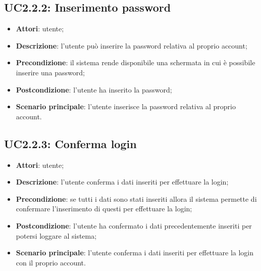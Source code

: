 \subsection{UC2.2.2: Inserimento password}
\label{UC2.2.2}
\begin{itemize}
\item \textbf{Attori}: utente;
\item \textbf{Descrizione}: l'utente può inserire la password relativa al proprio account;
\item \textbf{Precondizione}: il sistema rende disponibile una schermata in cui è possibile inserire una password;
\item \textbf{Postcondizione}: l'utente ha inserito la password;
\item \textbf{Scenario principale}:
l'utente inserisce la password relativa al proprio account.
\end{itemize}
\subsection{UC2.2.3: Conferma login}
\label{UC2.2.3}
\begin{itemize}
\item \textbf{Attori}: utente;
\item \textbf{Descrizione}: l'utente conferma i dati inseriti per effettuare la login;
\item \textbf{Precondizione}: se tutti i dati sono stati inseriti allora il sistema permette di confermare l'inserimento di questi per effettuare la login;
\item \textbf{Postcondizione}: l'utente ha confermato i dati precedentemente inseriti per potersi loggare al sistema;
\item \textbf{Scenario principale}:
l'utente conferma i dati inseriti per effettuare la login con il proprio account.
\end{itemize}
